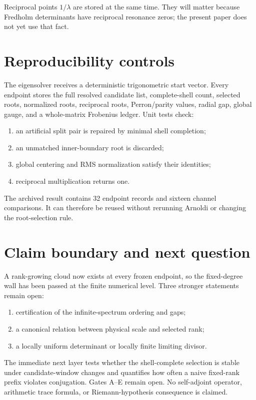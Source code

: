 \documentclass[11pt]{article}
\theoremstyle{remark}\newtheorem{remark}[theorem]{Remark}
\begin{document}
Reciprocal points $1/\lambda$ are stored at the same time. They will matter
because Fredholm determinants have reciprocal resonance zeros; the present
paper does not yet use that fact.

\section{Reproducibility controls}

The eigensolver receives a deterministic trigonometric start vector. Every
endpoint stores the full resolved candidate list, complete-shell count,
selected roots, normalized roots, reciprocal roots, Perron/parity values,
radial gap, global gauge, and a whole-matrix Frobenius ledger. Unit tests
check:
\begin{enumerate}[leftmargin=2em]
\item an artificial split pair is repaired by minimal shell completion;
\item an unmatched inner-boundary root is discarded;
\item global centering and RMS normalization satisfy their identities;
\item reciprocal multiplication returns one.
\end{enumerate}

The archived result contains 32 endpoint records and sixteen channel
comparisons. It can therefore be reused without rerunning Arnoldi or changing
the root-selection rule.

\section{Claim boundary and next question}

A rank-growing cloud now exists at every frozen endpoint, so the fixed-degree
wall has been passed at the finite numerical level. Three stronger statements
remain open:
\begin{enumerate}[leftmargin=2em]
\item certification of the infinite-spectrum ordering and gaps;
\item a canonical relation between physical scale and selected rank;
\item a locally uniform determinant or locally finite limiting divisor.
\end{enumerate}

The immediate next layer tests whether the shell-complete selection is stable
under candidate-window changes and quantifies how often a naive fixed-rank
prefix violates conjugation. Gates A--E remain open. No self-adjoint
operator, arithmetic trace formula, or Riemann-hypothesis consequence is
claimed.



\end{document}
